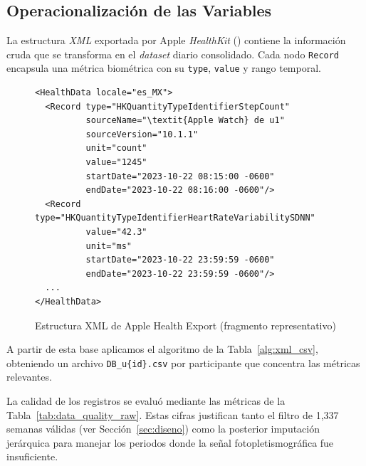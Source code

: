 \subsection{Operacionalización de las Variables}
\label{subsec:operacionalizacion_variables}

La estructura \textit{XML} exportada por Apple \textit{HealthKit} () contiene la información cruda que se transforma en el \textit{dataset} diario consolidado. Cada nodo \texttt{Record} encapsula una métrica biométrica con su \texttt{type}, \texttt{value} y rango temporal.

\begin{figure}[htbp]
    \centering
    \caption{Estructura XML de Apple Health Export (fragmento representativo)}
    \label{lst:xml_structure}
    \begin{minipage}{0.9\textwidth}
\begin{verbatim}
<HealthData locale="es_MX">
  <Record type="HKQuantityTypeIdentifierStepCount"
          sourceName="\textit{Apple Watch} de u1"
          sourceVersion="10.1.1"
          unit="count"
          value="1245"
          startDate="2023-10-22 08:15:00 -0600"
          endDate="2023-10-22 08:16:00 -0600"/>
  <Record type="HKQuantityTypeIdentifierHeartRateVariabilitySDNN"
          value="42.3"
          unit="ms"
          startDate="2023-10-22 23:59:59 -0600"
          endDate="2023-10-22 23:59:59 -0600"/>
  ...
</HealthData>
\end{verbatim}
    \end{minipage}
\end{figure}

A partir de esta base aplicamos el algoritmo de la Tabla~\ref{alg:xml_csv}, obteniendo un archivo \texttt{DB\_u\{id\}.csv} por participante que concentra las métricas relevantes.

La calidad de los registros se evaluó mediante las métricas de la Tabla~\ref{tab:data_quality_raw}. Estas cifras justifican tanto el filtro de 1,337 semanas válidas (ver Sección~\ref{sec:diseno}) como la posterior imputación jerárquica para manejar los periodos donde la señal fotopletismográfica fue insuficiente.

